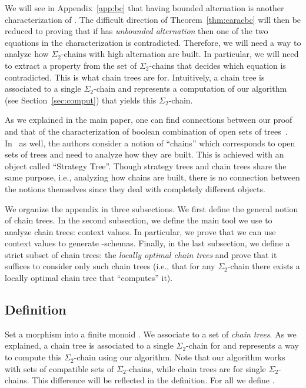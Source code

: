 \documentclass[envcountsame]{llncs}
\newcommand{\sic}[1]{\ensuremath{\Sigma_{#1}}\xspace}
\newcommand\chain{chain\xspace}
\newcommand\qchain[1]{\ensuremath{\sic{#1}}-chain\xspace}
\newcommand\chains{chains\xspace}
\newcommand\qchains[1]{\ensuremath{\sic{#1}}-chains\xspace}
\newcommand\dchain{\qchain{2}}
\newcommand\dchains{\qchains{2}}
\begin{document}
We will see in Appendix~\ref{app:bc} that  having
bounded alternation is another characterization of . The
difficult direction of Theorem~\ref{thm:caracbc} will then be reduced
to proving that if  has \emph{unbounded alternation}
then one of the two equations in the characterization is contradicted.
Therefore, we will need a way to analyze how \dchains with high
alternation are built. In particular, we will need to extract a
property from the set of \dchains that decides which equation is
contradicted. This is what \chain trees are for. Intuitively, a \chain
tree is associated to a single \dchain and represents a computation of
our algorithm (see Section~\ref{sec:comput}) that yields this \dchain.

As we explained in the main paper, one can find connections between
our proof and that of the characterization of boolean combination of
open sets of trees~\cite{bpopen}. In~\cite{bpopen} as well, the
authors consider a notion of  ``\chains'' which corresponds to open
sets of trees and need to analyze how they are built. This is achieved
with an object called ``Strategy Tree''. Though strategy trees and
\chain trees share the same purpose, i.e., analyzing how \chains are
built, there is no connection between the notions themselves since
they deal with completely different objects.

We organize the appendix in three subsections. We first define the 
general notion of \chain trees. In the second subsection, we define
the main tool we use to analyze \chain trees: context values. In
particular, we prove that we can use context values to generate
-schemas. Finally, in the last subsection, we define a strict
subset of \chain trees: the \emph{locally optimal \chain trees} and
prove that it suffices to consider only such  \chain trees (i.e., that
for any \dchain there exists a locally optimal \chain tree that
``computes'' it). 

\subsection{Definition}

Set  a morphism into a finite monoid . We
associate to  a set  of \emph{\chain trees}. As we
explained, a \chain tree is associated to a single \dchain for  and
represents a way to compute this \dchain using our algorithm. Note that our
algorithm works with sets of compatible sets of \dchains, while \chain trees
are for single \dchains. This difference will be reflected in the definition.
For all  we define .
\end{document}
